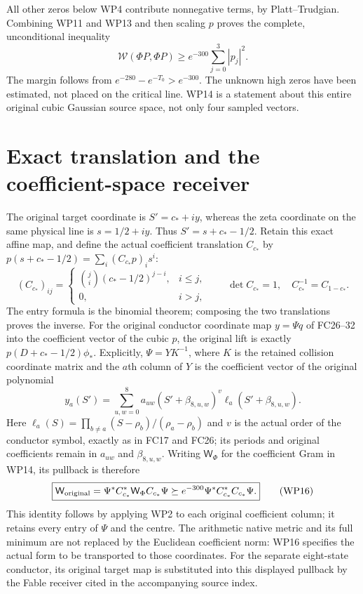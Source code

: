 \documentclass[11pt]{article}
\newcommand{\W}{\mathcal W}
\begin{document}
All other zeros below WP4 contribute nonnegative terms, by
Platt--Trudgian. Combining WP11 and WP13 and then scaling $p$
proves the complete, unconditional inequality
\[
 \boxed{\W(\Phi P,\Phi P)\ge e^{-300}\sum_{j=0}^3|p_j|^2.}
                                                                  \tag{WP14}
\]
The margin follows from $e^{-280}-e^{-T_0}>e^{-300}$.
The unknown high zeros have been estimated, not placed on the
critical line. WP14 is a statement about this entire original
cubic Gaussian source space, not only four sampled vectors.

\section{Exact translation and the coefficient-space receiver}
The original target coordinate is $S'=c_*+iy$, whereas the
zeta coordinate on the same physical line is $s=1/2+iy$.
Thus $S'=s+c_*-1/2$. Retain this exact affine map, and define
the actual coefficient translation $C_{c_*}$ by
$p(s+c_*-1/2)=\sum_i(C_{c_*}p)_i s^i$:
\[
 (C_{c_*})_{ij}=\begin{cases}\binom ji(c_*-1/2)^{j-i},&i\le j,\\
                  0,&i>j,\end{cases}\qquad
 \det C_{c_*}=1,\quad C_{c_*}^{-1}=C_{1-c_*}.                \tag{WP15}
\]
The entry formula is the binomial theorem; composing the two
translations proves the inverse. For the original conductor
coordinate map $y=\Psi q$ of FC26--32 \cite{FC} into the coefficient vector of the
cubic $p$, the original lift is exactly $p(D+c_*-1/2)\phi_*$.
Explicitly, $\Psi=YK^{-1}$, where $K$ is the retained collision
coordinate matrix and the $a$th column of $Y$ is the coefficient
vector of the original polynomial
\[
 y_a(S')=\sum_{u,w=0}^{8}a_{uw}
          (S'+\beta_{8,u,w})^v\ell_a(S'+\beta_{8,u,w}).
\]
Here $\ell_a(S)=\prod_{b\ne a}(S-\rho_b)/(\rho_a-\rho_b)$
and $v$ is the actual order of the conductor symbol, exactly as
in FC17 and FC26; its periods and original coefficients remain
in $a_{uw}$ and $\beta_{8,u,w}$.
Writing $\mathsf W_\Phi$ for the coefficient Gram in WP14,
its pullback is therefore
\[
 \boxed{\mathsf W_{\rm original}
  =\Psi^*C_{c_*}^*\mathsf W_\Phi C_{c_*}\Psi
  \succeq e^{-300}\Psi^*C_{c_*}^*C_{c_*}\Psi.}              \tag{WP16}
\]
This identity follows by applying WP2 to each original
coefficient column; it retains every entry of $\Psi$ and the
centre. The arithmetic native metric and its full minimum are
not replaced by the Euclidean coefficient norm: WP16 specifies
the actual form to be transported to those coordinates.
For the separate eight-state conductor, its original target map
is substituted into this displayed pullback by the Fable
receiver cited in the accompanying source index.
\end{document}
